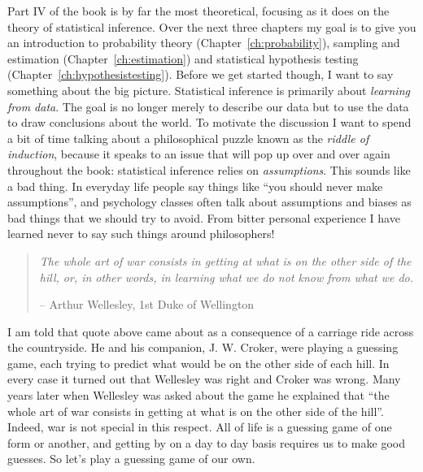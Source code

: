 

\noindent
Part IV of the book is by far the most theoretical, focusing as it does on the theory of statistical inference. Over the next three chapters my goal is to give you an introduction to probability theory (Chapter~\ref{ch:probability}), sampling and estimation (Chapter~\ref{ch:estimation}) and statistical hypothesis testing (Chapter~\ref{ch:hypothesistesting}). Before we get started though, I want to say something about the big picture. Statistical inference is primarily about {\it learning from data}. The goal is no longer merely to describe our data but to use the data to draw conclusions about the world. To motivate the discussion I want to spend a bit of time talking about a philosophical puzzle known as the {\it riddle of induction}, because it speaks to an issue that will pop up over and over again throughout the book: statistical inference relies on {\it assumptions}. This sounds like a bad thing. In everyday life people say things like ``you should never make assumptions'', and psychology classes often talk about assumptions and biases as bad things that we should try to avoid. From bitter personal experience I have learned never to say such things around philosophers! 

\begin{quote}
{\it The whole art of war consists in getting at what is on the other side of the hill, or, in other words, in learning what we do not know from what we do.}

\hspace*{2cm} -- Arthur Wellesley, 1st Duke of Wellington
\end{quote}

I am told that quote above came about as a consequence of a carriage ride across the countryside. He and his companion, J. W. Croker, were playing a guessing game, each trying to predict what would be on the other side of each hill. In every case it turned out that Wellesley was right and Croker was wrong. Many years later when Wellesley was asked about the game he explained that ``the whole art of war consists in getting at what is on the other side of the hill''. Indeed, war is not special in this respect. All of life is a guessing game of one form or another, and getting by on a day to day basis requires us to make good guesses. So let's play a guessing game of our own. 

